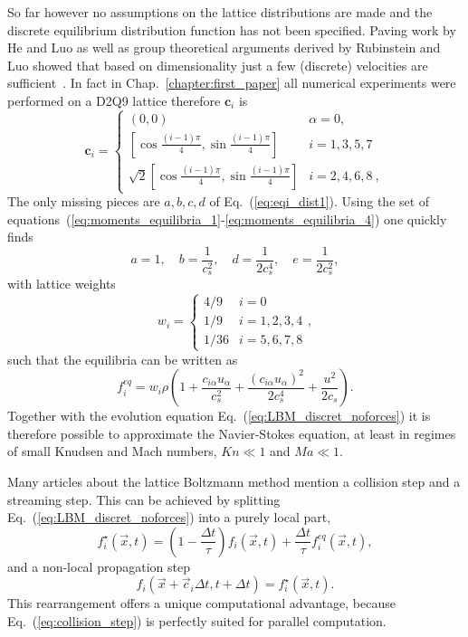 So far however no assumptions on the lattice distributions are made and the discrete equilibrium distribution function has not been specified.
Paving work by He and Luo as well as group theoretical arguments derived by Rubinstein and Luo showed that based on dimensionality just a few (discrete) velocities are sufficient~\cite{heTheoryLatticeBoltzmann1997, rubinsteinTheoryLatticeBoltzmann2008}.
In fact in Chap.~\ref{chapter:first_paper} all numerical experiments were performed on a D2Q9 lattice therefore $\mathbf{c}_{i}$ is
\begin{equation}\label{eq:speeds_method}
\mathbf{c}_{i}  =
\left\{
\begin{array}{ll}
(0,0) & \alpha = 0, \\
\left[\cos{\frac{(i-1)\pi}{4}}, \sin{\frac{(i-1)\pi}{4}} \right] &  i=1,3,5,7 \\
\sqrt{2}\left[\cos{\frac{(i-1)\pi}{4}}, \sin{\frac{(i-1)\pi}{4}} \right] & i=2,4,6,8~,
\end{array}
\right.    
\end{equation}
The only missing pieces are $a, b, c, d$ of Eq.~(\ref{eq:eqi_dist1}).
Using the set of equations~(\ref{eq:moments_equilibria_1}-\ref{eq:moments_equilibria_4}) one quickly finds
\begin{equation}
    a = 1,\quad b = \frac{1}{c_s^2},\quad d = \frac{1}{2c_s^4},\quad e = \frac{1}{2c_s^2},
\end{equation}
with lattice weights
\begin{equation}\label{eq:weightsD2Q9_meth}
w_{i} = \begin{cases}
4/9 &\text{$i = 0$}\\
1/9 &\text{$i = 1,2,3,4$}\\
1/36 &\text{$i = 5,6,7,8$}
\end{cases}
,
\end{equation}
such that the equilibria can be written as
\begin{equation}\label{eq:eqi_dist2}
    f_{i}^{eq} = w_{i}\rho\left(1 + \frac{c_{i\alpha} u_{\alpha}}{c_s^2} +  \frac{(c_{i\alpha} u_{\alpha})^2}{2c_s^4} + \frac{u^2}{2c_s}\right).
\end{equation}
Together with the evolution equation Eq.~(\ref{eq:LBM_discret_noforces}) it is therefore possible to approximate the Navier-Stokes equation, at least in regimes of small Knudsen and Mach numbers, $Kn \ll 1$ and $Ma \ll 1$.

Many articles about the lattice Boltzmann method mention a collision step and a streaming step.
This can be achieved by splitting Eq.~(\ref{eq:LBM_discret_noforces}) into a purely local part, 
\begin{equation}\label{eq:collision_step}
    f^{\star}_i(\vec{x},t) = \left(1-\frac{\Delta t}{\tau}\right)f_i(\vec{x},t) + \frac{\Delta t}{\tau}f_i^{eq}(\vec{x},t),
\end{equation}
and a non-local propagation step
\begin{equation}\label{eq:steaming_step}
    f_i(\vec{x}+\vec{c}_i\Delta t,t + \Delta t) = f^{\star}_i(\vec{x},t).
\end{equation}
This rearrangement offers a unique computational advantage, because Eq.~(\ref{eq:collision_step}) is perfectly suited for parallel computation.

